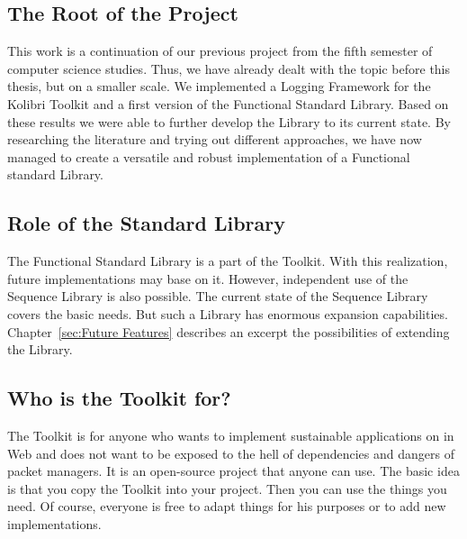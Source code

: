 \subsection{The Root of the Project}
\label{The Root of the Project}
This work is a continuation of our previous project from the fifth semester of
computer science studies. Thus, we have already dealt with the topic before
this thesis, but on a smaller scale. We implemented a Logging Framework for the
Kolibri Toolkit and a first version of the Functional Standard Library. Based
on these results we were able to further develop the Library to its current
state. By researching the literature and trying out different approaches, we
have now managed to create a versatile and robust implementation of a
Functional standard Library.

\subsection{Role of the Standard Library}
\label{sub:Role of the Standard Library}
The Functional Standard Library is a part of the Toolkit. With
this realization, future implementations may base on it. However, independent
use of the Sequence Library is also possible. The current state of the Sequence 
Library covers the basic needs. But such a Library has enormous expansion capabilities.
Chapter~\ref{sec:Future Features} describes an excerpt the possibilities of extending the Library.

\subsection{Who is the Toolkit for?}
\label{sub:Who is the Toolkit for?}
The Toolkit is for anyone who wants to implement sustainable applications on
in Web and does not want to be exposed to the hell of dependencies and dangers
of packet managers. It is an open-source project that
anyone can use. The basic idea is that you copy the Toolkit into your project.
Then you can use the things you need. Of course, everyone is free to adapt
things for his purposes or to add new implementations.
